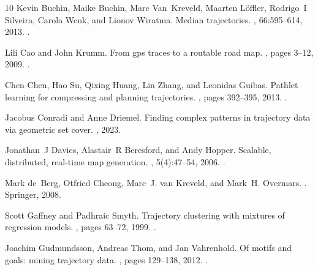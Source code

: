 \documentclass[11pt]{article}
\begin{document}
\begin{thebibliography}{10}
Kevin Buchin, Maike Buchin, Marc Van~Kreveld, Maarten L{\"o}ffler, Rodrigo~I
  Silveira, Carola Wenk, and Lionov Wiratma.
\newblock Median trajectories.
, 66:595--614, 2013.
\newblock \href {https://doi.org/10.1007/s00453-012-9654-2}
  {}.

Lili Cao and John Krumm.
\newblock From gps traces to a routable road map.
, pages 3--12, 2009.
\newblock \href {https://doi.org/10.1145/1653771.1653776}
  {}.

Chen Chen, Hao Su, Qixing Huang, Lin Zhang, and Leonidas Guibas.
\newblock Pathlet learning for compressing and planning trajectories.
, pages 392--395, 2013.
\newblock \href {https://doi.org/10.1145/2525314.2525443}
  {}.

Jacobus Conradi and Anne Driemel.
\newblock Finding complex patterns in trajectory data via geometric set cover.
, 2023.

Jonathan~J Davies, Alastair~R Beresford, and Andy Hopper.
\newblock Scalable, distributed, real-time map generation.
, 5(4):47--54, 2006.
\newblock \href {https://doi.org/10.1109/MPRV.2006.83}
  {}.

Mark de~Berg, Otfried Cheong, Marc~J. van Kreveld, and Mark~H. Overmars.
.
\newblock Springer, 2008.

Scott Gaffney and Padhraic Smyth.
\newblock Trajectory clustering with mixtures of regression models.
, pages 63--72, 1999.
\newblock \href {https://doi.org/10.1145/312129.312197}
  {}.

Joachim Gudmundsson, Andreas Thom, and Jan Vahrenhold.
\newblock Of motifs and goals: mining trajectory data.
, pages 129--138, 2012.
\newblock \href {https://doi.org/10.1145/2424321.2424339}
  {}.


\end{thebibliography}
\end{document}
